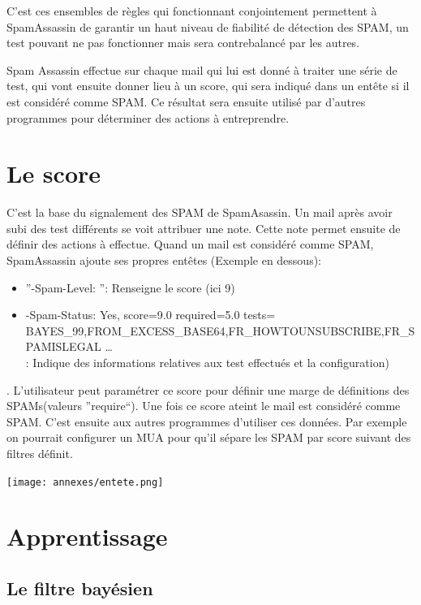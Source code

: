 \documentclass[a4paper,11pt]{article}
\begin{document}
\begin{description}
C'est ces ensembles de règles qui fonctionnant conjointement permettent à SpamAssassin de garantir un haut 
niveau de fiabilité de détection des SPAM, un test pouvant ne pas fonctionner mais sera contrebalancé par les autres.
 \end{description} 


Spam Assassin effectue sur chaque mail qui lui est donné à traiter une série de test, qui vont ensuite donner lieu à un score, qui sera indiqué dans un entête 
si il est considéré comme SPAM. 
Ce résultat sera ensuite utilisé par d'autres programmes pour déterminer des actions à entreprendre.


\section{Le score} \label{score}
C'est la base du signalement des SPAM de SpamAsassin. Un mail après avoir subi des test différents se voit attribuer une note. Cette note permet
ensuite de définir des actions à effectue. Quand un mail est considéré comme SPAM, SpamAssassin ajoute ses propres entêtes (Exemple en dessous):
\begin{itemize}
 \item ''-Spam-Level: \*\*\*\*\*\*\*\*\* '': Renseigne le score (ici 9)
 \item -Spam-Status: Yes, score=9.0 required=5.0 tests=\\BAYES\_99,FROM\_EXCESS\_BASE64,FR\_HOWTOUNSUBSCRIBE,FR\_SPAMISLEGAL \dots \\
 : Indique des informations relatives aux test effectués et la configuration)
\end{itemize}
. L'utilisateur peut paramétrer ce score pour définir une marge de définitions des SPAMs(valeurs ''require``). Une fois ce score ateint le mail est considéré comme SPAM.
C'est ensuite aux autres programmes d'utiliser ces données. Par exemple on pourrait configurer un MUA pour qu'il sépare 
les SPAM par score suivant des filtres définit. 

 \texttt{[image: annexes/entete.png]}



\section{Apprentissage}
\label{baye}
\subsection{Le filtre bayésien}
\end{document}
